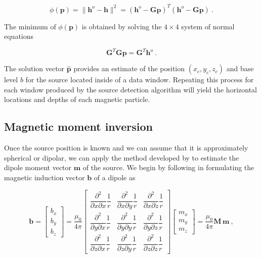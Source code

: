 \begin{equation}
\label{ZTSuSBbL16}
\phi(\mathbf{p}) = \|\mathbf{h}^o - \mathbf{h}\|^2 = (\mathbf{h}^o - \mathbf{G}\mathbf{p})^T (\mathbf{h}^o - \mathbf{G}\mathbf{p})\ .
\end{equation}

The minimum of $\phi(\mathbf{p})$ is obtained by solving the $4 \times 4$
system of normal equations

\begin{equation}
\mathbf{G}^T \mathbf{G} \mathbf{p} = \mathbf{G}^T \mathbf{h}^o\ .
\end{equation}

The solution vector $\hat{\mathbf{p}}$ provides an estimate of the position
$(x_c, y_c, z_c)$ and base level $b$ for the source located inside of a data
window. Repeating this process for each window produced by the source detection
algorithm will yield the horizontal locations and depths of each magnetic
particle.

\subsection{Magnetic moment inversion}

Once the source position is known and we can assume that it is approximately
spherical or dipolar, we can apply the method developed by
\citet{Oliveira2015Estimation} to estimate the dipole moment vector
$\mathbf{m}$ of the source. We begin by following
\citet{Oliveira2015Estimation} in formulating the magnetic induction vector
$\mathbf{b}$ of a dipole as

\begin{equation}
\label{eq_vector_dipole_field}
\mathbf{b}
=
\begin{bmatrix}
  b_x \\ b_y \\ b_z
\end{bmatrix}
= \dfrac{\mu_0}{4\pi}
\begin{bmatrix}
    \dfrac{\partial^2}{\partial x \partial x} \dfrac{1}{r}
  & \dfrac{\partial^2}{\partial x \partial y} \dfrac{1}{r}
  & \dfrac{\partial^2}{\partial x \partial z} \dfrac{1}{r}
  \\
    \dfrac{\partial^2}{\partial y \partial x} \dfrac{1}{r}
  & \dfrac{\partial^2}{\partial y \partial y} \dfrac{1}{r}
  & \dfrac{\partial^2}{\partial y \partial z} \dfrac{1}{r}
  \\
  \dfrac{\partial^2}{\partial z \partial x} \dfrac{1}{r}
  & \dfrac{\partial^2}{\partial z \partial y} \dfrac{1}{r}
  & \dfrac{\partial^2}{\partial z \partial z} \dfrac{1}{r}
\end{bmatrix}
\begin{bmatrix}
  m_x \\ m_y \\ m_z
\end{bmatrix}
= \dfrac{\mu_0}{4\pi} \mathbf{M}\,\mathbf{m}
\ ,
\end{equation}

